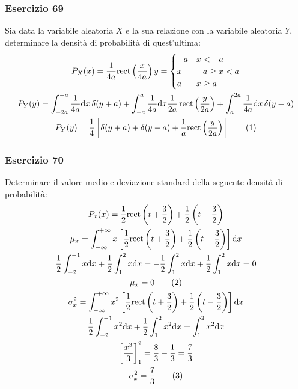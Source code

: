 \documentclass{article}
\newcommand{\rect}{\mathrm{rect}}
\newcommand{\df}{\mathrm{d}}
\newcommand{\tageq}{\tag{\stepcounter{equation}\theequation}}
\begin{document}
\subsubsection*{Esercizio 69}

Sia data la variabile aleatoria $X$ e la sua relazione con la variabile aleatoria $Y$, determinare la densità di probabilità di quest'ultima:
\begin{gather*}
    P_X(x)=\frac{1}{4a}\rect\left(\frac{x}{4a}\right)
    y=\begin{cases}
        -a&x<-a\\
        x&-a\geq x<a\\
        a&x\geq a
    \end{cases}\\
    P_Y(y)=\displaystyle\int_{-2a}^{-a}\frac{1}{4a}\df x\,\delta(y+a)+\int_{-a}^a\frac{1}{4a}\df x\frac{1}{2a}\,\rect\left(\frac{y}{2a}\right)+\int_{a}^{2a}\frac{1}{4a}\df x\,\delta(y-a)\\
    P_Y(y)=\displaystyle\frac{1}{4}\left[\delta(y+a)+\delta(y-a)+\frac{1}{a}\rect\left(\frac{y}{2a}\right)\right]\tageq
\end{gather*}

\subsubsection*{Esercizio 70}

Determinare il valore medio e deviazione standard della seguente densità di probabilità:
\begin{gather*}
    P_x(x)=\displaystyle\frac{1}{2}\rect\left({t+\frac{3}{2}}\right)+\frac{1}{2}\left({t-\frac{3}{2}}\right)\\
    \mu_x=\displaystyle\int_{-\infty}^{+\infty}x\left[\frac{1}{2}\rect\left({t+\frac{3}{2}}\right)+\frac{1}{2}\left({t-\frac{3}{2}}\right)\right]\df x\\
    \displaystyle\frac{1}{2}\int_{-2}^{-1}x\df x+\frac{1}{2}\int_{1}^2x\df x=-\frac{1}{2}\int_1^2x\df x+\frac{1}{2}\int_1^2x\df x=0\\
    \mu_x=0\tageq\\
    \sigma_x^2=\displaystyle\int_{-\infty}^{+\infty}x^2\left[\frac{1}{2}\rect\left({t+\frac{3}{2}}\right)+\frac{1}{2}\left({t-\frac{3}{2}}\right)\right]\df x\\
    \displaystyle\frac{1}{2}\int_{-2}^{-1}x^2\df x+\frac{1}{2}\int_1^2x^2\df x=\int_1^2x^2\df x\\
    \displaystyle\left[\frac{x^3}{3}\right]_1^2=\frac{8}{3}-\frac{1}{3}=\frac{7}{3}\\
    \sigma_x^2=\displaystyle\frac{7}{3}\tageq
\end{gather*}
\end{document}
